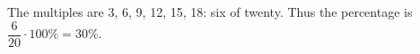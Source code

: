 The multiples are 3, 6, 9, 12, 15, 18: six of twenty. Thus the percentage is $\dfrac{6}{20}\cdot100\%=\boxed{30\%}$.
